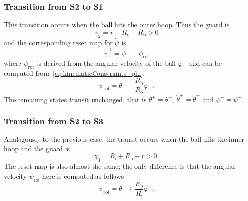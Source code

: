 \documentclass{ifacconf}
\begin{document}
\subsubsection{Transition from S2 to S1} %
\label{ssub:transition_from_s2_to_s1}
This transition occurs when the ball hits the outer hoop. Thus the guard is
\begin{equation}
  \gamma_2 = r-R_\mathrm{o} + R_\mathrm{b}  > 0
\end{equation}
and the corresponding reset map for $\dot{\psi}$ is
\begin{equation}
\label{eq:resetMapS2_to_S1}
      \dot{\psi}^+ = \dot{\psi}^- + \dot{\psi}_\mathrm{rot}^-
\end{equation}
where $\dot{\psi}_\mathrm{rot}^-$ is derived from the angular velocity of the ball $\dot{\varphi}^-$ and can be computed from~\eqref{eq:kinematicConstraints_phi}:
\begin{equation}
      \dot{\psi}_\mathrm{rot}^- = \dot{\theta}^- - \frac{R_\mathrm{b}}{R_\mathrm{o}}\dot{\varphi}^-.
\end{equation}
The remaining states transit unchanged, that is $\theta^+=\theta^-$, $\dot{\theta}^+=\dot{\theta}^-$ and $\psi^+=\psi^-$.

\subsubsection{Transition from S2 to S3} %
\label{ssub:transition_from_s2_to_s3}
Analogously to the previous case, the transit occurs when the ball hits the inner hoop and the guard is
\begin{equation}
  \gamma_3 = R_\mathrm{i} + R_\mathrm{b} - r > 0.
\end{equation}
The reset map is also almost the same; the only difference is that the angular velocity $\dot{\psi}_\mathrm{rot}^-$ here is computed as follows
\begin{equation}
\label{eq:resetMapS3_to_S2_Dpsi}
    \dot{\psi}_\mathrm{rot}^- = \dot{\theta}^- + \frac{R_\mathrm{b}}{R_\mathrm{i}}\dot{\varphi}^-.
\end{equation}
\end{document}
